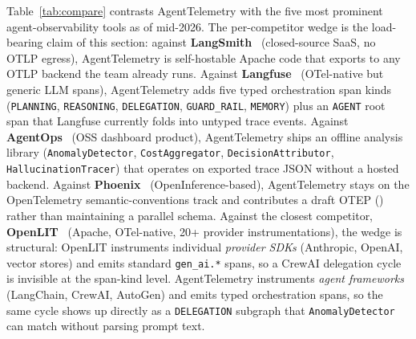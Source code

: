 \documentclass[10pt,conference]{IEEEtran}
\begin{document}
Table~\ref{tab:compare} contrasts AgentTelemetry with the five
most prominent agent-observability tools as of mid-2026. The
per-competitor wedge is the load-bearing claim of this section:
against \textbf{LangSmith}~\cite{langsmith} (closed-source SaaS,
no OTLP egress), AgentTelemetry is self-hostable Apache code that
exports to any OTLP backend the team already runs.
Against \textbf{Langfuse}~\cite{langfuse} (OTel-native but generic
LLM spans), AgentTelemetry adds five typed orchestration span
kinds (\texttt{PLANNING}, \texttt{REASONING}, \texttt{DELEGATION},
\texttt{GUARD\_RAIL}, \texttt{MEMORY}) plus an \texttt{AGENT} root
span that Langfuse currently folds into untyped trace events.
Against \textbf{AgentOps}~\cite{agentops} (OSS dashboard product),
AgentTelemetry ships an offline analysis library
(\texttt{AnomalyDetector}, \texttt{CostAggregator},
\texttt{DecisionAttributor}, \texttt{HallucinationTracer}) that
operates on exported trace JSON without a hosted backend.
Against \textbf{Phoenix}~\cite{phoenix} (OpenInference-based),
AgentTelemetry stays on the OpenTelemetry semantic-conventions
track and contributes a draft OTEP
() rather than maintaining
a parallel schema. Against the closest competitor,
\textbf{OpenLIT}~\cite{openlit} (Apache, OTel-native, 20+
provider instrumentations), the wedge is structural: OpenLIT
instruments individual \emph{provider SDKs} (Anthropic, OpenAI,
vector stores) and emits standard \texttt{gen\_ai.*} spans, so a
CrewAI delegation cycle is invisible at the span-kind level.
AgentTelemetry instruments \emph{agent frameworks} (LangChain,
CrewAI, AutoGen) and emits typed orchestration spans, so the same
cycle shows up directly as a \texttt{DELEGATION} subgraph that
\texttt{AnomalyDetector} can match without parsing prompt text.
\end{document}
